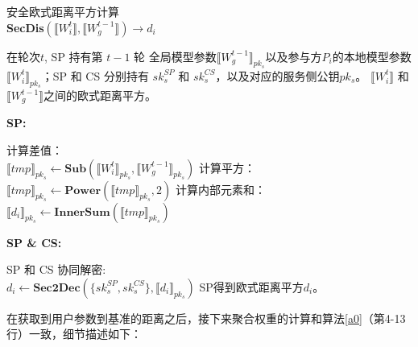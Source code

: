 \begin{algorithm}[htbp]
	\caption{安全欧式距离平方计算\\ \textbf{SecDis}$(\llbracket W_i^{t}\rrbracket, \llbracket W_g^{t-1}\rrbracket)\rightarrow d_i$}
	\label{a2}
	\begin{algorithmic}
		\REQUIRE 在轮次$t$, SP 持有第 $t-1$ 轮 全局模型参数$\llbracket W_g^{t-1} \rrbracket_{pk_s}$以及参与方$P_i$的本地模型参数 $\llbracket W_i^{t} \rrbracket_{pk_s}$；SP 和 CS 分别持有 $sk_{s}^{SP}$ 和 $sk_{s}^{CS}$，以及对应的服务侧公钥$pk_s$。
		\ENSURE $\llbracket W_i^{t}\rrbracket$ 和 $\llbracket W_g^{t-1}\rrbracket$之间的欧式距离平方。
	\end{algorithmic}
	\textbf{SP:}
	\begin{algorithmic}[1]
		\STATE 计算差值：\\$\llbracket tmp\rrbracket_{pk_s}\leftarrow {\textbf{Sub}}(\llbracket W_i^{t} \rrbracket_{pk_s}, \llbracket W_g^{t-1} \rrbracket_{pk_s})$
		\STATE 计算平方：\\$\llbracket tmp \rrbracket_{pk_s}\leftarrow {\textbf{Power}}(\llbracket tmp\rrbracket_{pk_s}, 2)$
		\STATE 计算内部元素和：\\$\llbracket d_i \rrbracket_{pk_s}\leftarrow {\textbf{InnerSum}}(\llbracket tmp \rrbracket_{pk_s})$
	\end{algorithmic}
	\textbf{SP \& CS:}
	\begin{algorithmic}[1]
		\STATE SP 和 CS 协同解密: \\ $d_i \leftarrow \textbf{Sec2Dec}(\{sk_{s}^{SP}, sk_{s}^{CS}\}, \llbracket d_i \rrbracket_{pk_s})$
		\RETURN SP得到欧式距离平方$d_i$。
	\end{algorithmic}
\end{algorithm}

在获取到用户参数到基准的距离之后，接下来聚合权重的计算和算法\ref{a0}（第4-13行）一致，细节描述如下：

